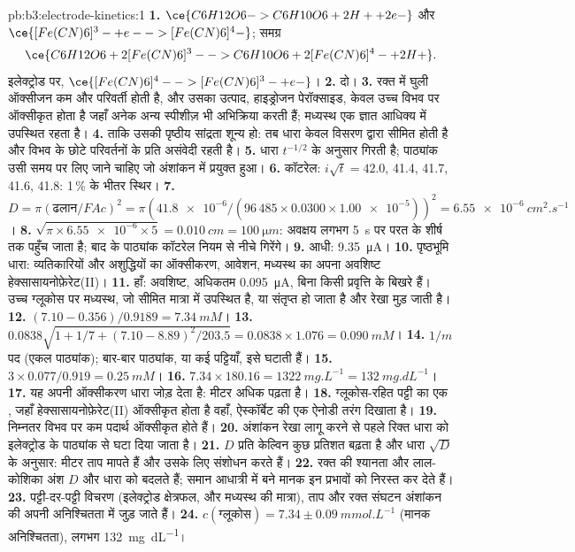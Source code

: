\begin{solution}{pb:b3:electrode-kinetics:1}
\textbf{1.} $\ce{C6H12O6 -> C6H10O6 + 2 H+ + 2 e-}$ और $\ce{[Fe(CN)6]^3- + e- -> [Fe(CN)6]^4-}$;
समग्र
\[
  \ce{C6H12O6 + 2 [Fe(CN)6]^3- -> C6H10O6 + 2 [Fe(CN)6]^4- + 2 H+} .
\]
इलेक्ट्रोड पर, $\ce{[Fe(CN)6]^4- -> [Fe(CN)6]^3- + e-}$।
\textbf{2.} दो।
\textbf{3.} रक्त में घुली ऑक्सीजन कम और परिवर्ती होती है, और उसका उत्पाद,
हाइड्रोजन पेरॉक्साइड, केवल उच्च विभव पर ऑक्सीकृत होता है जहाँ अनेक अन्य
स्पीशीज़ भी अभिक्रिया करती हैं; मध्यस्थ एक ज्ञात आधिक्य में उपस्थित रहता है।
\textbf{4.} ताकि उसकी पृष्ठीय सांद्रता शून्य हो: तब धारा केवल विसरण द्वारा
सीमित होती है और विभव के छोटे परिवर्तनों के प्रति असंवेदी रहती है।
\textbf{5.} धारा $t^{-1/2}$ के अनुसार गिरती है; पाठ्यांक उसी समय पर लिए जाने चाहिए जो
अंशांकन में प्रयुक्त हुआ।
\textbf{6.} कॉटरेल: $i\sqrt t = 42.0$, 41.4, 41.7, 41.6, 41.8: 1\,\% के भीतर स्थिर।
\textbf{7.} $D = \pi(\text{ढलान}/FAc)^2 = \pi(\num{41.8e-6}/(96\,485 \times 0.0300 \times \num{1.00e-5}))^2 = \qty{6.55e-6}{cm^2.s^{-1}}$।
\textbf{8.} $\sqrt{\pi \times \num{6.55e-6} \times 5} = \qty{0.010}{cm} = \qty{100}{\micro m}$: अवक्षय लगभग \qty{5}{s} पर
परत के शीर्ष तक पहुँच जाता है; बाद के पाठ्यांक कॉटरेल नियम से नीचे गिरेंगे।
\textbf{9.} आधी: \qty{9.35}{\micro A}।
\textbf{10.} पृष्ठभूमि धारा: व्यतिकारियों और अशुद्धियों का ऑक्सीकरण,
आवेशन, मध्यस्थ का अपना अवशिष्ट हेक्सासायनोफ़ेरेट(II)।
\textbf{11.} हाँ: अवशिष्ट, अधिकतम \qty{0.095}{\micro A}, बिना किसी प्रवृत्ति के बिखरे हैं। उच्च ग्लूकोस पर मध्यस्थ, जो
सीमित मात्रा में उपस्थित है, या  संतृप्त हो जाता है और रेखा मुड़ जाती है।
\textbf{12.} $(7.10 - 0.356)/0.9189 = \qty{7.34}{mM}$।
\textbf{13.} $0.0838\sqrt{1 + 1/7 + (7.10 - 8.89)^2/203.5} = 0.0838 \times 1.076 = \qty{0.090}{mM}$।
\textbf{14.} $1/m$ पद (एकल पाठ्यांक); बार-बार पाठ्यांक, या कई पट्टियाँ,
इसे घटाती हैं।
\textbf{15.} $3 \times 0.077/0.919 = \qty{0.25}{mM}$।
\textbf{16.} $7.34 \times 180.16 = \qty{1322}{mg.L^{-1}} = \qty{132}{mg.dL^{-1}}$।
\textbf{17.} यह अपनी ऑक्सीकरण धारा जोड़ देता है: मीटर अधिक पढ़ता है।
\textbf{18.} ग्लूकोस-रहित पट्टी का एक , जहाँ हेक्सासायनोफ़ेरेट(II) ऑक्सीकृत होता है वहाँ,
ऐस्कॉर्बेट की एक ऐनोडी तरंग दिखाता है।
\textbf{19.} निम्नतर विभव पर कम पदार्थ ऑक्सीकृत होते हैं।
\textbf{20.} अंशांकन रेखा लागू करने से पहले रिक्त धारा को  इलेक्ट्रोड के पाठ्यांक से
घटा दिया जाता है।
\textbf{21.} $D$ प्रति केल्विन कुछ प्रतिशत बढ़ता है और धारा $\sqrt D$ के अनुसार: मीटर
ताप मापते हैं और उसके लिए संशोधन करते हैं।
\textbf{22.} रक्त की श्यानता और लाल-कोशिका अंश $D$ और धारा को बदलते हैं;
समान आधात्री में बने मानक इन प्रभावों को निरस्त कर देते हैं।
\textbf{23.} पट्टी-दर-पट्टी विचरण (इलेक्ट्रोड क्षेत्रफल,  और मध्यस्थ की मात्रा),
ताप और रक्त संघटन अंशांकन की अपनी अनिश्चितता में जुड़ जाते हैं।
\textbf{24.} \textbf{$c(\text{ग्लूकोस}) = 7.34 \pm \qty{0.09}{mmol.L^{-1}}$} (मानक अनिश्चितता), लगभग \qty{132}{mg.dL^{-1}}।
\end{solution}
